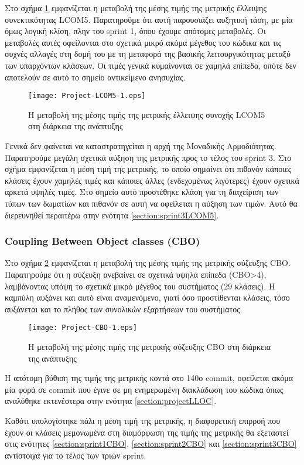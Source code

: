 Στο σχήμα \ref{fig:projectLCOM5} εμφανίζεται η μεταβολή της μέσης τιμής
της μετρικής έλλειψης συνεκτικότητας LCOM5. Παρατηρούμε ότι αυτή
παρουσιάζει αυξητική τάση, με μία όμως λογική κλίση, πλην
του sprint 1, όπου έχουμε απότομες μεταβολές. Οι μεταβολές αυτές
οφείλονται στο σχετικά μικρό ακόμα μέγεθος του κώδικα και τις συχνές
αλλαγές στη δομή του με τη μεταφορά της βασικής λειτουργικότητας μεταξύ
των υπαρχόντων κλάσεων. Οι τιμές γενικά κυμαίνονται
σε χαμηλά επίπεδα, οπότε δεν αποτελούν σε αυτό το σημείο αντικείμενο
ανησυχίας.

\begin{figure}
\centering
\texttt{[image: Project-LCOM5-1.eps]}
\caption{Η μεταβολή της μέσης τιμής της μετρικής έλλειψης συνοχής
LCOM5 στη διάρκεια της ανάπτυξης}
\label{fig:projectLCOM5}
\end{figure}

Γενικά δεν φαίνεται να καταστρατηγείται η αρχή της Μοναδικής
Αρμοδιότητας. Παρατηρούμε μεγάλη σχετικά αύξηση της μετρικής προς το τέλος του
sprint 3.
Στο σχήμα εμφανίζεται η μέση τιμή της μετρικής, το
οποίο σημαίνει ότι πιθανόν κάποιες κλάσεις έχουν χαμηλές τιμές και
κάποιες άλλες (ενδεχομένως λιγότερες) έχουν σχετικά αρκετά υψηλές τιμές.
Στο σημείο αυτό προστέθηκε κλάση για τη διαχείριση των
τύπων των δωματίων και πιθανόν σε αυτή να οφείλεται η αύξηση των τιμών.
Αυτό θα διερευνηθεί περαιτέρω στην ενότητα
\ref{section:sprint3LCOM5}.

\subsubsection{Coupling Between Object classes (CBO)}

Στο σχήμα \ref{fig:projectCBO} εμφανίζεται η μεταβολή της μέσης τιμής της
μετρικής σύζευξης CBO. Παρατηρούμε ότι η σύζευξη ανεβαίνει σε σχετικά υψηλά επίπεδα
(CBO>4), λαμβάνοντας υπόψη το σχετικά μικρό μέγεθος του συστήματος
(29 κλάσεις). Η καμπύλη αυξάνει και αυτό είναι αναμενόμενο, γιατί όσο
προστίθενται κλάσεις, τόσο αυξάνεται και το πλήθος των συνολικών
εξαρτήσεων του συστήματος.

\begin{figure}
\centering
\texttt{[image: Project-CBO-1.eps]}
\caption{Η μεταβολή της μέσης τιμής της μετρικής σύζευξης
CBO στη διάρκεια της ανάπτυξης}
\label{fig:projectCBO}
\end{figure}

Η απότομη βύθιση της τιμής της μετρικής κοντά στο 140ο commit, οφείλεται
ακόμα μία φορά σε commit που έγινε σε μη ενημερωμένη διακλάδωση του
κώδικα όπως αναλύθηκε εκτενέστερα στην ενότητα \ref{section:projectLLOC}.

Καθότι υπολογίστηκε πάλι η μέση τιμή της μετρικής, η διαφορετική επιρροή
που έχουν οι κλάσεις μεμονωμένα στη διαμόρφωση της τιμής της μετρικής θα
εξεταστεί στις ενότητες \ref{section:sprint1CBO},
\ref{section:sprint2CBO} και \ref{section:sprint3CBO} αντίστοιχα για το
τέλος των τριών sprint.

